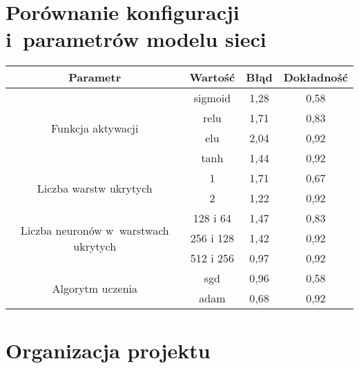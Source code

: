 \chapter{Porównanie konfiguracji i~parametrów modelu sieci}
\label{ch:nn_comparison_table}
\begin{table}[!h]
    \centering
    \begin{tabular}{c|c|c|c}
        \toprule
        Parametr & Wartość   & Błąd & Dokładność \\
        \midrule
        \multirow{4}{*}{Funkcja aktywacji}                 
            & sigmoid   & 1,28 & 0,58       \\
            & relu      & 1,71 & 0,83       \\
            & elu       & 2,04 & 0,92       \\
            & tanh      & 1,44 & 0,92       \\
        \midrule
        \multirow{2}{*}{Liczba warstw ukrytych}
            & 1         & 1,71 & 0,67       \\
            & 2         & 1,22 & 0,92       \\
        \midrule
        \multirow{3}{*}{\parbox{5cm}
            {\centering Liczba neuronów w~warstwach ukrytych}}
            & 128 i 64  & 1,47 & 0,83       \\
            & 256 i 128 & 1,42 & 0,92       \\
            & 512 i 256 & 0,97 & 0,92       \\
        \midrule
        \multirow{2}{*}{Algorytm uczenia}            
            & sgd       & 0,96 & 0,58       \\
            & adam      & 0,68 & 0,92       \\
        \bottomrule
    \end{tabular}
\end{table}

\chapter{Organizacja projektu}
